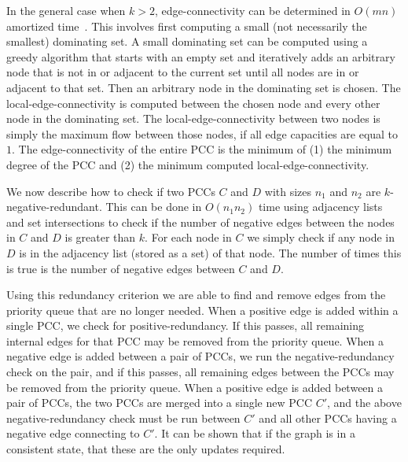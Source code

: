 In the general case when $k>2$, edge-connectivity can be determined in $O(m n)$ amortized
  time~\cite{esfahanian_connectivity_2017}.
This involves first computing a small (not necessarily the smallest) dominating set.
A small dominating set can be computed using a greedy algorithm that starts with an empty set and iteratively
  adds an arbitrary node that is not in or adjacent to the current set until all nodes are in or adjacent to that
  set.
Then an arbitrary node in the dominating set is chosen.
The local-edge-connectivity is computed between the chosen node and every other node in the dominating set.
The local-edge-connectivity between two nodes is simply the maximum flow between those nodes, if all edge
  capacities are equal to $1$.
The edge-connectivity of the entire PCC is the minimum of
(1) the minimum degree of the PCC and
(2) the minimum computed local-edge-connectivity.


We now describe how to check if two PCCs $C$ and $D$ with sizes $n_1$ and $n_2$ are $k$-negative-redundant.
This can be done in $O(n_1 n_2)$ time using adjacency lists and set intersections to check if the number of
  negative edges between the nodes in $C$ and $D$ is greater than $k$.
For each node in $C$ we simply check if any node in $D$ is in the adjacency list (stored as a set) of that node.
The number of times this is true is the number of negative edges between $C$ and $D$.


Using this redundancy criterion we are able to find and remove edges from the priority queue that are no longer
  needed.
When a positive edge is added within a single PCC, we check for positive-redundancy.
If this passes, all remaining internal edges for that PCC may be removed from the priority queue.
When a negative edge is added between a pair of PCCs, we run the negative-redundancy check on the pair, and if
  this passes, all remaining edges between the PCCs may be removed from the priority queue.
When a positive edge is added between a pair of PCCs, the two PCCs are merged into a single new PCC $C'$, and the
  above negative-redundancy check must be run between $C'$ and all other PCCs having a negative edge connecting to
  $C'$.
It can be shown that if the graph is in a consistent state, that these are the only updates required.


